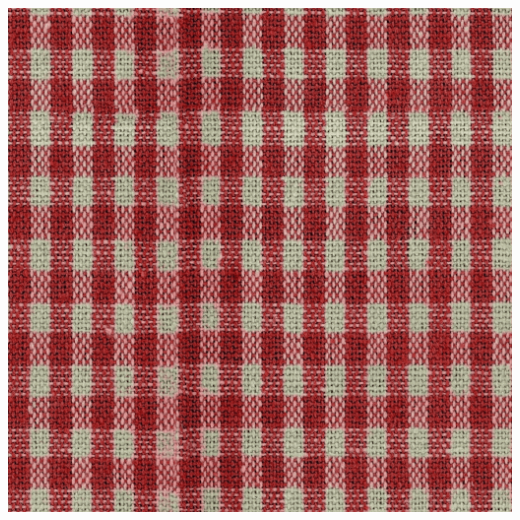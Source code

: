 \documentclass[11pt,class=report,crop=false]{standalone}
\begin{document}
\begin{center}
	\qquad\qquad\qquad
	\includegraphics[scale=\myscale,scale=0.15]{figures/carre-texture-coton}
\end{center}
\end{document}
